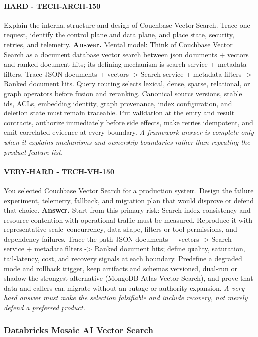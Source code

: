 \paragraph{HARD - TECH-ARCH-150} Explain the internal structure and design of Couchbase Vector Search. Trace one request, identify the control plane and data plane, and place state, security, retries, and telemetry.
\textbf{Answer.} Mental model: Think of Couchbase Vector Search as a document database vector search between json documents + vectors and ranked document hits; its defining mechanism is search service + metadata filters. Trace JSON documents + vectors -> Search service + metadata filters -> Ranked document hits. Query routing selects lexical, dense, sparse, relational, or graph operators before fusion and reranking. Canonical source versions, stable ids, ACLs, embedding identity, graph provenance, index configuration, and deletion state must remain traceable. Put validation at the entry and result contracts, authorize immediately before side effects, make retries idempotent, and emit correlated evidence at every boundary.
\textit{A framework answer is complete only when it explains mechanisms and ownership boundaries rather than repeating the product feature list.}
\paragraph{VERY-HARD - TECH-VH-150} You selected Couchbase Vector Search for a production system. Design the failure experiment, telemetry, fallback, and migration plan that would disprove or defend that choice.
\textbf{Answer.} Start from this primary risk: Search-index consistency and resource contention with operational traffic must be measured. Reproduce it with representative scale, concurrency, data shape, filters or tool permissions, and dependency failures. Trace the path JSON documents + vectors -> Search service + metadata filters -> Ranked document hits; define quality, saturation, tail-latency, cost, and recovery signals at each boundary. Predefine a degraded mode and rollback trigger, keep artifacts and schemas versioned, dual-run or shadow the strongest alternative (MongoDB Atlas Vector Search), and prove that data and callers can migrate without an outage or authority expansion.
\textit{A very-hard answer must make the selection falsifiable and include recovery, not merely defend a preferred product.}
\subsubsection*{Databricks Mosaic AI Vector Search}
